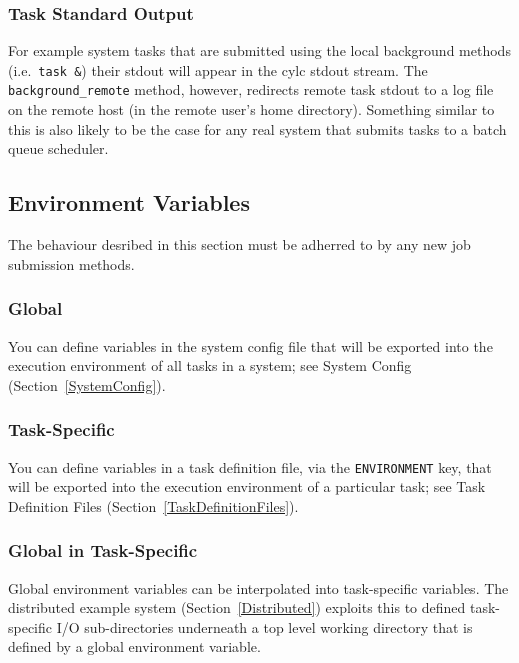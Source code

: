 \documentclass[11pt,a4paper]{article}
\begin{document}
\subsubsection{Task Standard Output}
\label{TaskStandardOutput}

For example system tasks that are submitted using the local background
methods (i.e.\ \lstinline=task &=) their stdout will appear in the cylc
stdout stream. The \lstinline=background_remote= method, however,
redirects remote task stdout to a log file on the remote host (in the
remote user's home directory).  Something similar to this is also likely
to be the case for any real system that submits tasks to a batch queue
scheduler.


\subsection{Environment Variables}
\label{EnvironmentVariables}

The behaviour desribed in this section must be adherred to by any new
job submission methods.

\subsubsection{Global}

You can define variables in the system config file that will be exported
into the execution environment of all tasks in a system; see 
System Config (Section~\ref{SystemConfig}).

\subsubsection{Task-Specific}

You can define variables in a task definition file, via the 
\lstinline=ENVIRONMENT= key, that will be exported into the execution
environment of a particular task; see Task Definition Files
(Section~\ref{TaskDefinitionFiles}).

\subsubsection{Global in Task-Specific}

Global environment variables can be interpolated into task-specific
variables.  The distributed example system (Section~\ref{Distributed})
exploits this to defined task-specific I/O sub-directories underneath a
top level working directory that is defined by a global environment
variable.
\end{document}
